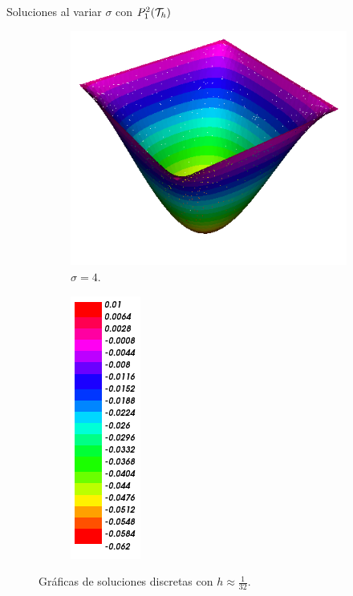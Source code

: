 \begin{frame}{Soluciones al variar $\sigma$ con $\relax{P}_1^2(\mathcal{T}_h)$}
\begin{figure}[h!]
\begin{subfigure}[b]{0.27\textwidth}
				\includegraphics[scale=0.20]{img/Difusion/Recortes/steady_diffusion_approx_sigma_4.png}
				\caption{$\sigma=4$.}
			\end{subfigure}
			\begin{subfigure}[b]{0.15\textwidth}
				\centering
				\includegraphics[scale=0.25]{img/Difusion/Recortes/steady_diffusion_values.png}
			\end{subfigure}
			\caption{Gráficas de soluciones discretas con $h\approx\frac{1}{32}$.}
		\end{figure}
		
		\end{frame}
		
